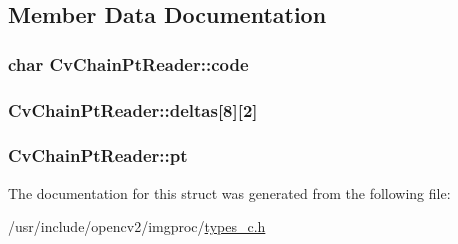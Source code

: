 \subsection{Member Data Documentation}
\hypertarget{structCvChainPtReader_a9c1efd4be0f72928c9b984a90d3a2028}{
\subsubsection[{code}]{\setlength{\rightskip}{0pt plus 5cm}char Cv\-Chain\-Pt\-Reader\-::code}}\label{structCvChainPtReader_a9c1efd4be0f72928c9b984a90d3a2028}
\hypertarget{structCvChainPtReader_a3c70d6cc005e5da1eae1fa9f2e7d5353}{
\subsubsection[{deltas}]{ Cv\-Chain\-Pt\-Reader\-::deltas\mbox{[}8\mbox{]}\mbox{[}2\mbox{]}}}\label{structCvChainPtReader_a3c70d6cc005e5da1eae1fa9f2e7d5353}
\hypertarget{structCvChainPtReader_a0b44d7d5a0cb6d768b95caf4022c35a4}{
\subsubsection[{pt}]{ Cv\-Chain\-Pt\-Reader\-::pt}}\label{structCvChainPtReader_a0b44d7d5a0cb6d768b95caf4022c35a4}


The documentation for this struct was generated from the following file\-:\begin{DoxyCompactItemize}
\item 
/usr/include/opencv2/imgproc/\hyperlink{imgproc_2types__c_8h}{types\-\_\-c.\-h}\end{DoxyCompactItemize}
